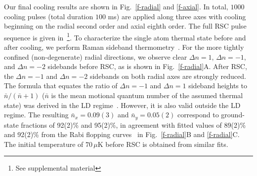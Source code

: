 \documentclass[aps,prl,twocolumn,groupedaddress]{revtex4-1}
\begin{document}
Our final cooling results are shown in Fig.~\ref{f-radial} and \ref{f-axial}.
In total, $1000$ cooling pulses (total duration $100$ ms) are applied
along three axes with cooling beginning on the radial second order and axial eighth order.
The full RSC pulse sequence is given in~\footnote{See supplemental material}.
To characterize the single atom thermal state before and after cooling,
we perform Raman sideband thermometry~\cite{Monroe1995, Meekhof1996}.
For the more tightly confined (non-degenerate) radial directions,
we observe clear $\Delta n=1$, $\Delta n=-1$, and $\Delta n=-2$ sidebands before RSC, as is shown in Fig.~\ref{f-radial}A.
After RSC, the $\Delta n=-1$ and $\Delta n=-2$ sidebands on both radial axes are strongly reduced.
The formula that equates the ratio of $\Delta n=-1$ and $\Delta n=1$ sideband heights to $\bar{n}/(\bar{n}+1)$ ($\bar{n}$ is the mean motional quantum number of the assumed thermal state) was derived in the LD regime~\cite{Monroe1995}. However, it is also valid outside the LD regime.  The resulting $\bar{n}_x=0.09(3)$ and $\bar{n}_y=0.05(2)$ correspond to ground-state fractions of 92(2)\% and 95(2)\%,  in agreement with fitted values of 89(2)\% and 92(2)\% from the Rabi flopping curves~ \cite{Meekhof1996} in Fig.~\ref{f-radial}B and \ref{f-radial}C.
The initial temperature of $70\,\mu$K before RSC is obtained
from similar fits. %
\end{document}
